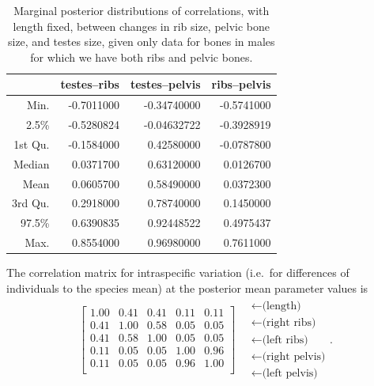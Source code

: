 \documentclass[12pt]{article}
\begin{document}


\begin{table}[ht]
\centering
\begin{tabular}{rrrr}
  \hline
        &  testes--ribs & testes--pelvis & ribs--pelvis \\
  \hline
Min.    & -0.7011000  & -0.34740000  &-0.5741000 \\
2.5\%   &  -0.5280824 &  -0.04632722 & -0.3928919 \\
1st Qu. & -0.1584000  &  0.42580000  &-0.0787800 \\
Median  &  0.0371700  &  0.63120000  & 0.0126700 \\
Mean    &  0.0605700  &  0.58490000  & 0.0372300 \\
3rd Qu. &  0.2918000  &  0.78740000  & 0.1450000 \\
97.5\%  &   0.6390835 &   0.92448522 &  0.4975437 \\
Max.    &  0.8554000  &  0.96980000  & 0.7611000 \\
   \hline
\end{tabular}
  \caption{Marginal posterior distributions of correlations, with length fixed,
  between changes in rib size, pelvic bone size, and testes size,
  given only data for bones in males for which we have both ribs and pelvic bones.
  \label{tab:complete_males_posterior_cors}
}
\end{table}

The correlation matrix for intraspecific variation 
(i.e.\ for differences of individuals to the species mean)
at the posterior mean parameter values is
\begin{align}
\begin{bmatrix}
   1.00 & 0.41 & 0.41 & 0.11 & 0.11 \\ 
   0.41 & 1.00 & 0.58 & 0.05 & 0.05 \\ 
   0.41 & 0.58 & 1.00 & 0.05 & 0.05 \\ 
   0.11 & 0.05 & 0.05 & 1.00 & 0.96 \\ 
   0.11 & 0.05 & 0.05 & 0.96 & 1.00 \\ 
 \end{bmatrix}
\quad \begin{matrix}
  \leftarrow \text{(length)} \\
  \leftarrow \text{(right ribs)} \\
  \leftarrow \text{(left ribs)} \\
  \leftarrow \text{(right pelvis)} \\
  \leftarrow \text{(left pelvis)} 
\end{matrix}  .
\end{align}
\end{document}
